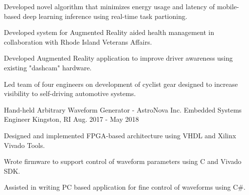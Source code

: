 \begin{cventries}
{\begin{cvitems}
        \item{Developed novel algorithm that minimizes energy usage and latency of mobile-based deep learning inference using real-time task partioning.}
        \item{Developed system for Augmented Reality aided health management in collaboration with Rhode Island Veterans Affairs.}
        \item{Developed Augmented Reality application to improve driver awareness using existing "dashcam" hardware.} 
        \item{Led team of four engineers on development of cyclist gear designed to increase visibility to self-driving automotive systems.}
      \end{cvitems}
    }
    
  \cventry
    {Hand-held Arbitrary Waveform Generator - AstroNova Inc.}
    {Embedded Systems Engineer}
    {Kingston, RI}
    {Aug. 2017 - May 2018}
    {
      \begin{cvitems}
        \item {Designed and implemented FPGA-based architecture using VHDL and Xilinx Vivado Tools.}
        \item {Wrote firmware to support control of waveform parameters using C and Vivado SDK.}
        \item {Assisted in writing PC based application for fine control of waveforms using C\#.}
      \end{cvitems}
    }
 \end{cventries}
